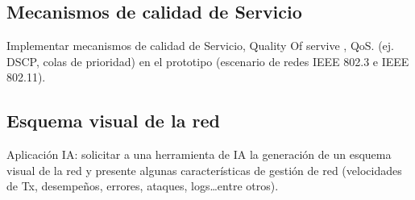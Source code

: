 \subsection{\textbf{Mecanismos de calidad de Servicio}}
Implementar mecanismos de calidad de Servicio, Quality Of servive , QoS. (ej. DSCP, colas de prioridad) en el prototipo (escenario de redes IEEE 802.3 e IEEE 802.11).

\subsection{\textbf{Esquema visual de la red}}
Aplicación IA: solicitar a una herramienta de IA la generación de un esquema visual de la red y presente algunas características de gestión de red (velocidades de Tx, desempeños, errores, ataques, logs…entre otros).
